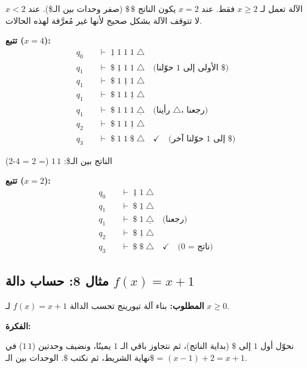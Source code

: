 \documentclass[14pt]{extarticle}
\begin{document}
\begin{boxNote}
الآلة تعمل لـ $x \geq 2$ فقط. عند $x = 2$ يكون الناتج $\$\,\$$ (صفر وحدات بين الـ\$). عند $x < 2$ لا تتوقف الآلة بشكل صحيح لأنها غير مُعرَّفة لهذه الحالات.
\end{boxNote}

\textbf{تتبع ($x = 4$):}
\begin{align*}
q_0 \quad &\vdash \; \underline{1} \; 1 \; 1 \; 1 \; \triangle \\
q_1 \quad &\vdash \; \$ \; \underline{1} \; 1 \; 1 \; \triangle \quad \text{(حوّلنا $1$ الأولى إلى $\$$)} \\
q_1 \quad &\vdash \; \$ \; 1 \; \underline{1} \; 1 \; \triangle \\
q_1 \quad &\vdash \; \$ \; 1 \; 1 \; \underline{1} \; \triangle \\
q_1 \quad &\vdash \; \$ \; 1 \; 1 \; 1 \; \underline{\triangle} \quad \text{(رأينا $\triangle$، رجعنا)} \\
q_2 \quad &\vdash \; \$ \; 1 \; 1 \; \underline{1} \; \triangle \\
q_3 \quad &\vdash \; \$ \; 1 \; 1 \; \$ \; \triangle \quad \checkmark \quad \text{(حوّلنا آخر $1$ إلى $\$$)}
\end{align*}

الناتج بين الـ\$: $1\,1$ (= 2 = 4-2) \checkmark

\textbf{تتبع ($x = 2$):}
\begin{align*}
q_0 \quad &\vdash \; \underline{1} \; 1 \; \triangle \\
q_1 \quad &\vdash \; \$ \; \underline{1} \; \triangle \\
q_1 \quad &\vdash \; \$ \; 1 \; \underline{\triangle} \quad \text{(رجعنا)} \\
q_2 \quad &\vdash \; \$ \; \underline{1} \; \triangle \\
q_3 \quad &\vdash \; \$ \; \$ \; \triangle \quad \checkmark \quad \text{(ناتج = 0)}
\end{align*}

\clearpage

\subsection{مثال 8: حساب دالة $f(x) = x + 1$}

\textbf{المطلوب:} بناء آلة تيورينج تحسب الدالة $f(x) = x + 1$ لـ $x \geq 0$.

\medskip
\textbf{الفكرة:}

نحوّل أول $1$ إلى $\$$ (بداية الناتج)، ثم نتجاوز باقي الـ $1$ يمينًا، ونضيف وحدتين ($1\,1$) في نهاية الشريط، ثم نكتب $\$$. الوحدات بين الـ$\$$ = $(x-1) + 2 = x+1$.
\end{document}

